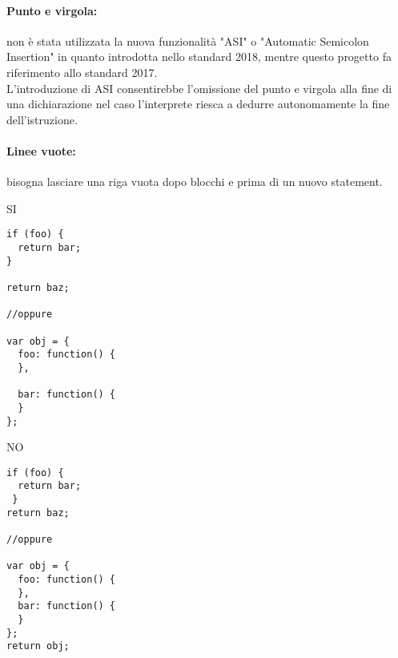 \documentclass[../ProcessiPrimari.tex]{subfiles}
\begin{document}
\paragraph*{Punto e virgola: }
non è stata utilizzata la nuova funzionalità "ASI" o "Automatic Semicolon Insertion" in quanto introdotta nello standard  2018, mentre questo progetto fa riferimento allo standard 2017.\\
L'introduzione di ASI consentirebbe l'omissione del punto e virgola alla fine di una dichiarazione nel caso l'interprete riesca a dedurre autonomamente la fine dell'istruzione.

\paragraph*{Linee vuote: }
bisogna lasciare una riga vuota dopo blocchi e prima di un nuovo statement.

\begin{center}{
\begin{minipage}{6cm}
	{\begin{center}SI\end{center}}
	\begin{Verbatim}[frame=single]
if (foo) {
  return bar;
}

return baz;
	
//oppure 
	
var obj = {
  foo: function() {
  },
	
  bar: function() {
  }
};
\end{Verbatim}
\end{minipage}
\hfil
\begin{minipage}{6cm}
	{\begin{center}NO\end{center}}
	\begin{Verbatim}[frame=single]
if (foo) {
  return bar;
 }
return baz;
	
//oppure
	
var obj = {
  foo: function() {
  },
  bar: function() {
  }
};
return obj;
	
	\end{Verbatim}
\end{minipage}
}
\end{center}
\end{document}
